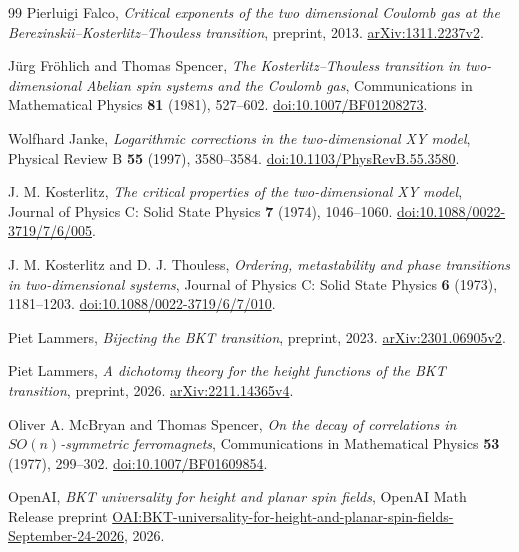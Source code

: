 \begin{thebibliography}{99}
Pierluigi Falco,
\emph{Critical exponents of the two dimensional Coulomb gas at the
Berezinskii--Kosterlitz--Thouless transition},
preprint, 2013.
\href{https://arxiv.org/abs/1311.2237v2}{arXiv:1311.2237v2}.

J\"urg Fr\"ohlich and Thomas Spencer,
\emph{The Kosterlitz--Thouless transition in two-dimensional Abelian
spin systems and the Coulomb gas},
Communications in Mathematical Physics \textbf{81} (1981), 527--602.
\href{https://doi.org/10.1007/BF01208273}{doi:10.1007/BF01208273}.

Wolfhard Janke,
\emph{Logarithmic corrections in the two-dimensional XY model},
Physical Review B \textbf{55} (1997), 3580--3584.
\href{https://doi.org/10.1103/PhysRevB.55.3580}{doi:10.1103/PhysRevB.55.3580}.

J. M. Kosterlitz,
\emph{The critical properties of the two-dimensional XY model},
Journal of Physics C: Solid State Physics \textbf{7} (1974), 1046--1060.
\href{https://doi.org/10.1088/0022-3719/7/6/005}{doi:10.1088/0022-3719/7/6/005}.

J. M. Kosterlitz and D. J. Thouless,
\emph{Ordering, metastability and phase transitions in two-dimensional
systems},
Journal of Physics C: Solid State Physics \textbf{6} (1973), 1181--1203.
\href{https://doi.org/10.1088/0022-3719/6/7/010}{doi:10.1088/0022-3719/6/7/010}.

Piet Lammers,
\emph{Bijecting the BKT transition},
preprint, 2023.
\href{https://arxiv.org/abs/2301.06905v2}{arXiv:2301.06905v2}.

Piet Lammers,
\emph{A dichotomy theory for the height functions of the BKT transition},
preprint, 2026.
\href{https://arxiv.org/abs/2211.14365v4}{arXiv:2211.14365v4}.

Oliver A. McBryan and Thomas Spencer,
\emph{On the decay of correlations in \(SO(n)\)-symmetric ferromagnets},
Communications in Mathematical Physics \textbf{53} (1977), 299--302.
\href{https://doi.org/10.1007/BF01609854}{doi:10.1007/BF01609854}.

OpenAI,
\emph{BKT universality for height and planar spin fields},
OpenAI Math Release preprint
\href{https://github.com/openai/math/blob/main/preprints/BKT-universality-for-height-and-planar-spin-fields-September-24-2026/paper.pdf}{OAI:BKT-universality-for-height-and-planar-spin-fields-September-24-2026},
2026.


\end{thebibliography}
